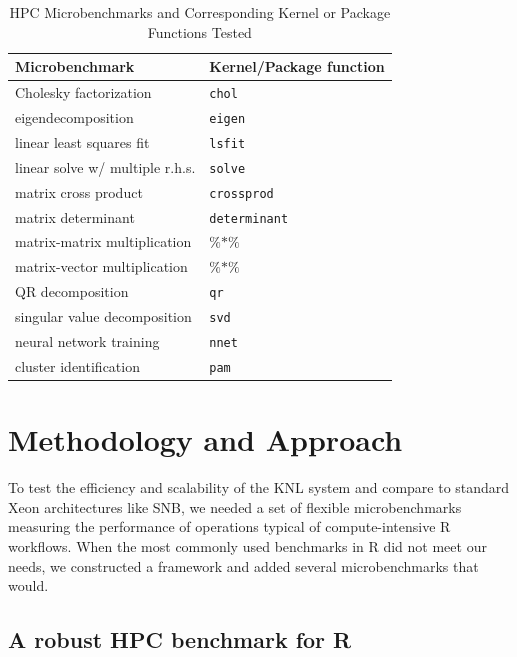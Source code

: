 \begin{table}
  \caption{HPC Microbenchmarks and Corresponding Kernel or Package Functions Tested}
  \label{tab:microbenchmarks}
  \begin{tabular}{ll}
    \toprule
    Microbenchmark & Kernel/Package function \\
    \midrule
    Cholesky factorization       & \texttt{chol} \\
    eigendecomposition           & \texttt{eigen} \\
    linear least squares fit     & \texttt{lsfit} \\
    linear solve w/ multiple r.h.s. & \texttt{solve} \\
    matrix cross product         & \texttt{crossprod} \\
    matrix determinant           & \texttt{determinant} \\
    matrix-matrix multiplication & $\%$$*$$\%$ \\
    matrix-vector multiplication & $\%$$*$$\%$ \\
    QR decomposition             & \texttt{qr} \\
    singular value decomposition & \texttt{svd} \\
    neural network training      & \texttt{nnet} \\
    cluster identification       & \texttt{pam} \\
    \bottomrule
  \end{tabular}
\end{table}

\section{Methodology and Approach}\label{sec:methodology}

To test the efficiency and scalability of the KNL system and compare to standard
Xeon architectures like SNB, we needed a set of flexible microbenchmarks measuring
the performance of operations typical of compute-intensive R workflows.
When the most commonly used benchmarks in R did not meet our needs, we constructed a
framework and added several microbenchmarks that would.

\subsection{A robust HPC benchmark for R} \label{sec:hpcBenchmark}

